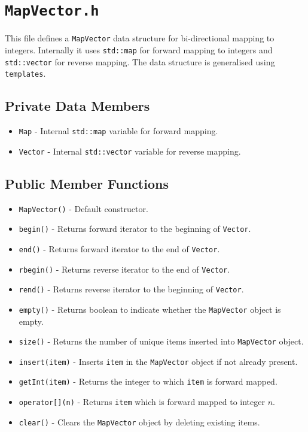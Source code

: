 \section{\texttt{MapVector.h}}
\label{sec:MapVectorH}
This file defines a \texttt{MapVector} data structure for bi-directional 
mapping to integers. Internally it uses \texttt{std::map} for forward mapping 
to integers and \texttt{std::vector} for reverse mapping. The data structure is 
generalised using \texttt{templates}.

\subsection{Private Data Members}
\label{subsec:PrivateDataMembersMapVectorH}
\begin{itemize} \tightlist
    \item \texttt{Map} - Internal \texttt{std::map} variable for forward mapping.
    \item \texttt{Vector} - Internal \texttt{std::vector} variable for reverse mapping.
\end{itemize}

\subsection{Public Member Functions}
\label{subsec:PublicMemberFunctionsMapVectorH}
\begin{itemize} \tightlist
    \item \texttt{MapVector()} - Default constructor.
    \item \texttt{begin()} - Returns forward iterator to the beginning of \texttt{Vector}.
    \item \texttt{end()} - Returns forward iterator to the end of \texttt{Vector}.
    \item \texttt{rbegin()} - Returns reverse iterator to the end of \texttt{Vector}.
    \item \texttt{rend()} - Returns reverse iterator to the beginning of \texttt{Vector}.
    \item \texttt{empty()} - Returns boolean to indicate whether the \texttt{MapVector} object is empty.
    \item \texttt{size()} - Returns the number of unique items inserted into \texttt{MapVector} object.
    \item \texttt{insert(item)} - Inserts \texttt{item} in the \texttt{MapVector} object if not already present.
    \item \texttt{getInt(item)} - Returns the integer to which \texttt{item} is forward mapped.
    \item \texttt{operator[](n)} - Returns \texttt{item} which is forward mapped to integer $n$.
    \item \texttt{clear()} - Clears the \texttt{MapVector} object by deleting existing items.
\end{itemize}

